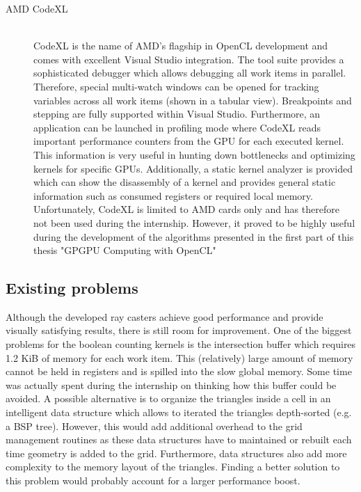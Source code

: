 \begin{description}
\item[AMD CodeXL] \hfill \\
CodeXL is the name of AMD's flagship in OpenCL development and comes with excellent Visual Studio integration. The tool suite provides a sophisticated debugger which allows debugging all work items in parallel. Therefore, special multi-watch windows can be opened for tracking variables across all work items (shown in a tabular view). Breakpoints and stepping are fully supported within Visual Studio. Furthermore, an application can be launched in profiling mode where CodeXL reads important performance counters from the GPU for each executed kernel. This information is very useful in hunting down bottlenecks and optimizing kernels for specific GPUs. Additionally, a static kernel analyzer is provided which can show the disassembly of a kernel and provides general static information such as consumed registers or required local memory. Unfortunately, CodeXL is limited to AMD cards only and has therefore not been used during the internship. However, it proved to be highly useful during the development of the algorithms presented in the first part of this thesis "GPGPU Computing with OpenCL"
\end{description}

\subsection{Existing problems}

Although the developed ray casters achieve good performance and provide visually satisfying results, there is still room for improvement. One of the biggest problems for the boolean counting kernels is the intersection buffer which requires 1.2 KiB of memory for each work item. This (relatively) large amount of memory cannot be held in registers and is spilled into the slow global memory. Some time was actually spent during the internship on thinking how this buffer could be avoided. A possible alternative is to organize the triangles inside a cell in an intelligent data structure which allows to iterated the triangles depth-sorted (e.g. a BSP tree). However, this would add additional overhead to the grid management routines as these data structures have to maintained or rebuilt each time geometry is added to the grid. Furthermore, data structures also add more complexity to the memory layout of the triangles. Finding a better solution to this problem would probably account for a larger performance boost.

